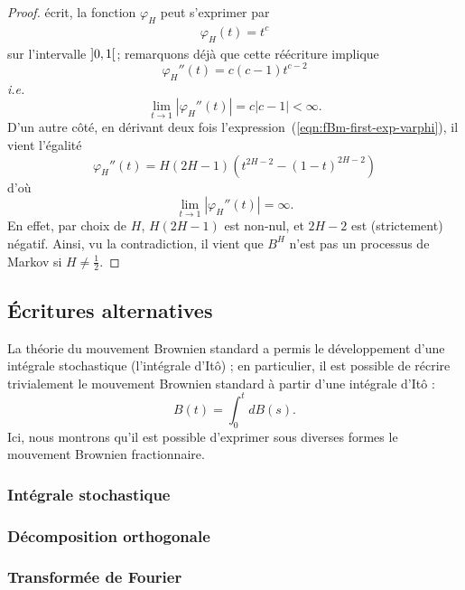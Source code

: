 \begin{proof}
  écrit, la fonction $\varphi_H$ peut s'exprimer par
  \begin{align*}
    \varphi_H(t) = t^c
  \end{align*}
  sur l'intervalle $\left]0,1\right[$; remarquons déjà que cette réécriture
  implique \[ \varphi_H''(t) = c(c-1)t^{c-2} \]
  \emph{i.e.} \[\lim_{t\to 1} |\varphi_H''(t)| = c|c-1| < \infty .\]
  D'un autre côté, en dérivant deux fois
  l'expression~(\ref{eqn:fBm-first-exp-varphi}), il vient
  l'égalité \[ \varphi_H''(t) = H(2H-1)(t^{2H-2}-(1-t)^{2H-2}) \]
  d'où \[ \lim_{t\to 1} |\varphi_H''(t)| = \infty .\]
  En effet, par choix de $H$, $H(2H-1)$ est non-nul, et $2H-2$ est
  (strictement) négatif. Ainsi, vu la contradiction, il vient que
  $B^H$ n'est pas un processus de Markov si $H\neq\frac{1}{2}$.
\end{proof}


\subsection{Écritures alternatives}
\label{subsec:fBm-other-forms}

La théorie du mouvement Brownien standard a permis le développement
d'une intégrale stochastique (l'intégrale d'Itô) ; en particulier, il
est possible de récrire trivialement le mouvement Brownien standard à
partir d'une intégrale d'Itô : \[ B(t) = \int_0^t dB(s) .\] Ici, nous
montrons qu'il est possible d'exprimer sous diverses formes le
mouvement Brownien fractionnaire.

\subsubsection*{Intégrale stochastique}

\subsubsection*{Décomposition orthogonale}

\subsubsection*{Transformée de Fourier}
